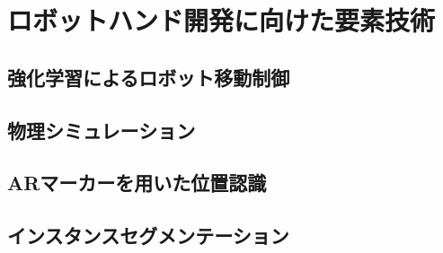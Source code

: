 \chapter{ロボットハンド開発に向けた要素技術}
\label{chap_experiment}
\newpage

\section{強化学習によるロボット移動制御}


\section{物理シミュレーション}


\section{ARマーカーを用いた位置認識}


\section{インスタンスセグメンテーション}

